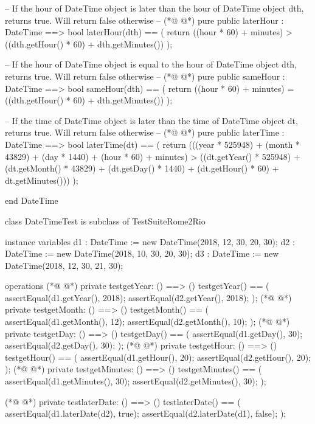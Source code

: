 \begin{vdmpp}[breaklines=true]
   -- If the hour of DateTime object is later than the hour of DateTime object dth, returns true. Will return false otherwise --
(*@
\label{laterHour:59}
@*)
   pure public laterHour : DateTime ==> bool
    laterHour(dth) == (
     return ((hour * 60) + minutes) > ((dth.getHour() * 60) + dth.getMinutes())
    );
   
   -- If the hour of DateTime object is equal to the hour of DateTime object dth, returns true. Will return false otherwise --
(*@
\label{sameHour:65}
@*)
   pure public sameHour : DateTime ==> bool
    sameHour(dth) == (
     return ((hour * 60) + minutes) = ((dth.getHour() * 60) + dth.getMinutes())
    );
    
   -- If the time of DateTime object is later than the time of DateTime object dt, returns true. Will return false otherwise --
(*@
\label{laterTime:71}
@*)
   pure public laterTime : DateTime ==> bool
   laterTime(dt) == (
    return (((year * 525948) + (month * 43829)  + (day * 1440) + (hour * 60) + minutes) > ((dt.getYear() * 525948) + (dt.getMonth() * 43829) + (dt.getDay() * 1440) + (dt.getHour() * 60) + dt.getMinutes()))
    );

end DateTime

class DateTimeTest is subclass of TestSuiteRome2Rio

 instance variables
  d1 : DateTime := new DateTime(2018, 12, 30, 20, 30);
  d2 : DateTime := new DateTime(2018, 10, 30, 20, 30);
  d3 : DateTime := new DateTime(2018, 12, 30, 21, 30);
 
 operations
(*@
\label{testgetYear:86}
@*)
  private testgetYear: () ==> ()
     testgetYear() ==
     (
       assertEqual(d1.getYear(), 2018);
       assertEqual(d2.getYear(), 2018);
     );
(*@
\label{testgetMonth:92}
@*)
   private testgetMonth: () ==> ()
     testgetMonth() ==
     (
       assertEqual(d1.getMonth(), 12);
       assertEqual(d2.getMonth(), 10);
     );
(*@
\label{testgetDay:98}
@*)
   private testgetDay: () ==> ()
     testgetDay() ==
     (
       assertEqual(d1.getDay(), 30);
       assertEqual(d2.getDay(), 30);
     );
(*@
\label{testgetHour:104}
@*)
   private testgetHour: () ==> ()
     testgetHour() ==
     (
       assertEqual(d1.getHour(), 20);
       assertEqual(d2.getHour(), 20);
     );
(*@
\label{testgetMinutes:110}
@*)
   private testgetMinutes: () ==> ()
     testgetMinutes() ==
     (
       assertEqual(d1.getMinutes(), 30);
       assertEqual(d2.getMinutes(), 30);
     );
   
(*@
\label{testlaterDate:117}
@*)
   private testlaterDate: () ==> ()
     testlaterDate() ==
     (
       assertEqual(d1.laterDate(d2), true);
       assertEqual(d2.laterDate(d1), false);
     );
     

\end{vdmpp}
